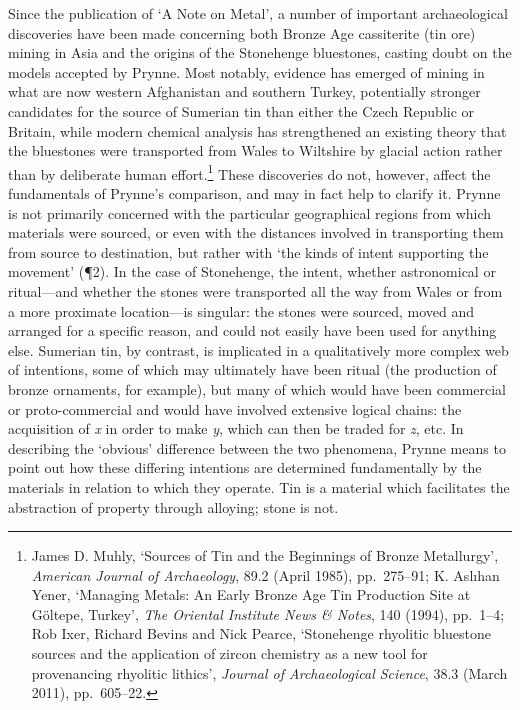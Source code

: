 \documentclass[]{article}
\begin{document}
Since the publication of `A Note on Metal', a number of important
archaeological discoveries have been made concerning both Bronze Age
cassiterite (tin ore) mining in Asia and the origins of the Stonehenge
bluestones, casting doubt on the models accepted by Prynne. Most
notably, evidence has emerged of mining in what are now western
Afghanistan and southern Turkey, potentially stronger candidates for the
source of Sumerian tin than either the Czech Republic or Britain, while
modern chemical analysis has strengthened an existing theory that the
bluestones were transported from Wales to Wiltshire by glacial action
rather than by deliberate human effort.\footnote{James D. Muhly,
  `Sources of Tin and the Beginnings of Bronze Metallurgy',
  \emph{American Journal of Archaeology}, 89.2 (April 1985),
  pp.~275--91; K. Aslıhan Yener, `Managing Metals: An Early Bronze Age
  Tin Production Site at Göltepe, Turkey', \emph{The Oriental Institute
  News \& Notes}, 140 (1994), pp.~1--4; Rob Ixer, Richard Bevins and
  Nick Pearce, `Stonehenge rhyolitic bluestone sources and the
  application of zircon chemistry as a new tool for provenancing
  rhyolitic lithics', \emph{Journal of Archaeological Science}, 38.3
  (March 2011), pp.~605--22.} These discoveries do not, however, affect
the fundamentals of Prynne's comparison, and may in fact help to clarify
it. Prynne is not primarily concerned with the particular geographical
regions from which materials were sourced, or even with the distances
involved in transporting them from source to destination, but rather
with `the kinds of intent supporting the movement' (¶2). In the case of
Stonehenge, the intent, whether astronomical or ritual---and whether the
stones were transported all the way from Wales or from a more proximate
location---is singular: the stones were sourced, moved and arranged for
a specific reason, and could not easily have been used for anything
else. Sumerian tin, by contrast, is implicated in a qualitatively more
complex web of intentions, some of which may ultimately have been ritual
(the production of bronze ornaments, for example), but many of which
would have been commercial or proto-commercial and would have involved
extensive logical chains: the acquisition of \emph{x} in order to make
\emph{y}, which can then be traded for \emph{z}, etc. In describing the
`obvious' difference between the two phenomena, Prynne means to point
out how these differing intentions are determined fundamentally by the
materials in relation to which they operate. Tin is a material which
facilitates the abstraction of property through alloying; stone is not.
\end{document}
